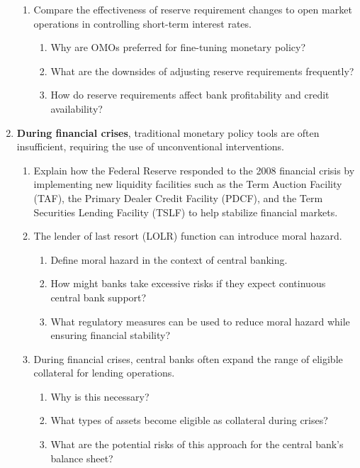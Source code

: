 \begin{enumerate}
\begin{enumerate}
        \item Compare the effectiveness of reserve requirement changes to open
        market operations in controlling short-term interest rates.
        \begin{enumerate}
            \item Why are OMOs preferred for fine-tuning monetary policy?
            \item What are the downsides of adjusting reserve requirements
            frequently?
            \item How do reserve requirements affect bank profitability and credit
            availability?
        \end{enumerate}
    \end{enumerate}

    \item \textbf{During financial crises}, traditional monetary policy tools are often insufficient,
    requiring the use of unconventional interventions.

    \begin{enumerate}
        \item Explain how the Federal Reserve responded to the 2008 financial
        crisis by implementing new liquidity facilities such as the Term Auction
        Facility (TAF), the Primary Dealer Credit Facility (PDCF), and the
        Term Securities Lending Facility (TSLF) to help stabilize financial
        markets.

        \item The lender of last resort (LOLR) function can introduce moral hazard.
        \begin{enumerate}
            \item Define moral hazard in the context of central banking.
            \item How might banks take excessive risks if they expect continuous
            central bank support?
            \item What regulatory measures can be used to reduce moral hazard
            while ensuring financial stability?
        \end{enumerate}

        \item During financial crises, central banks often expand the range of
        eligible collateral for lending operations.
        \begin{enumerate}
            \item Why is this necessary?
            \item What types of assets become eligible as collateral during crises?
            \item What are the potential risks of this approach for the central
            bank’s balance sheet?
        \end{enumerate}
    \end{enumerate}


\end{enumerate}
